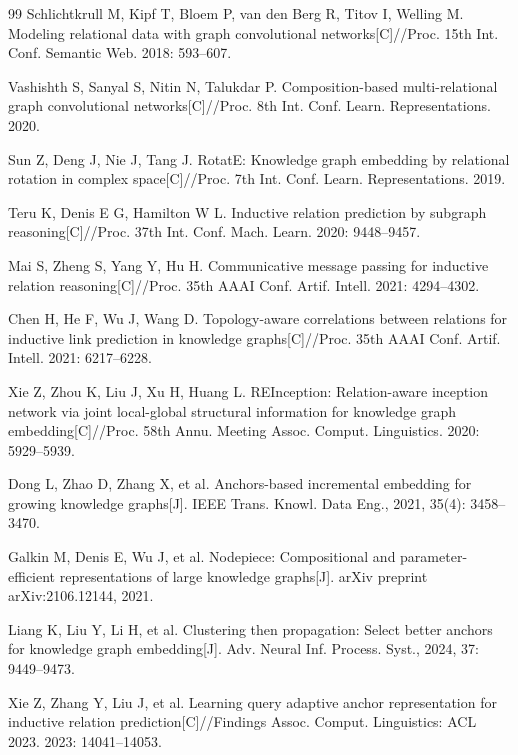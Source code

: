 \documentclass[preprint,12pt]{elsarticle}
\begin{document}
\renewcommand{\refname}{References}
\begin{thebibliography}{99}
Schlichtkrull M, Kipf T, Bloem P, van den Berg R, Titov I, Welling M.
Modeling relational data with graph convolutional networks[C]//Proc. 15th Int. Conf. Semantic Web.
2018: 593–607.

Vashishth S, Sanyal S, Nitin N, Talukdar P.
Composition-based multi-relational graph convolutional networks[C]//Proc. 8th Int. Conf. Learn. Representations.
2020.

Sun Z, Deng J, Nie J, Tang J.
RotatE: Knowledge graph embedding by relational rotation in complex space[C]//Proc. 7th Int. Conf. Learn. Representations.
2019.

Teru K, Denis E G, Hamilton W L.
Inductive relation prediction by subgraph reasoning[C]//Proc. 37th Int. Conf. Mach. Learn.
2020: 9448–9457.

Mai S, Zheng S, Yang Y, Hu H.
Communicative message passing for inductive relation reasoning[C]//Proc. 35th AAAI Conf. Artif. Intell.
2021: 4294–4302.

Chen H, He F, Wu J, Wang D.
Topology-aware correlations between relations for inductive link prediction in knowledge graphs[C]//Proc. 35th AAAI Conf. Artif. Intell.
2021: 6217–6228.

Xie Z, Zhou K, Liu J, Xu H, Huang L.
REInception: Relation-aware inception network via joint local-global structural information for knowledge graph embedding[C]//Proc. 58th Annu. Meeting Assoc. Comput. Linguistics.
2020: 5929–5939.

Dong L, Zhao D, Zhang X, et al.
Anchors-based incremental embedding for growing knowledge graphs[J]. IEEE Trans. Knowl. Data Eng., 2021, 35(4): 3458--3470.

Galkin M, Denis E, Wu J, et al.
Nodepiece: Compositional and parameter-efficient representations of large knowledge graphs[J]. arXiv preprint arXiv:2106.12144, 2021.

Liang K, Liu Y, Li H, et al.
Clustering then propagation: Select better anchors for knowledge graph embedding[J]. Adv. Neural Inf. Process. Syst., 2024, 37: 9449--9473.

Xie Z, Zhang Y, Liu J, et al.
Learning query adaptive anchor representation for inductive relation prediction[C]//Findings Assoc. Comput. Linguistics: ACL 2023.
2023: 14041--14053.


\end{thebibliography}
\end{document}

